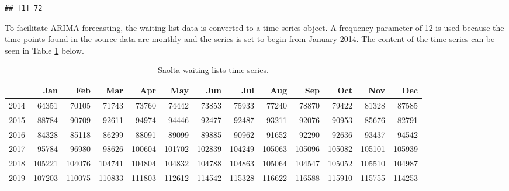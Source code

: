 \documentclass[
  12pt,
]{article}
\newenvironment{Shaded}{\begin{snugshade}}{\end{snugshade}}
\newcommand{\DataTypeTok}[1]{\textcolor[rgb]{0.13,0.29,0.53}{#1}}
\newcommand{\DecValTok}[1]{\textcolor[rgb]{0.00,0.00,0.81}{#1}}
\newcommand{\KeywordTok}[1]{\textcolor[rgb]{0.13,0.29,0.53}{\textbf{#1}}}
\newcommand{\NormalTok}[1]{#1}
\newcommand{\OperatorTok}[1]{\textcolor[rgb]{0.81,0.36,0.00}{\textbf{#1}}}
\newcommand{\StringTok}[1]{\textcolor[rgb]{0.31,0.60,0.02}{#1}}
\begin{document}
\begin{verbatim}
## [1] 72
\end{verbatim}

\normalsize

To facilitate ARIMA forecasting, the waiting list data is converted to a time series object. A frequency parameter of 12 is used because the time points found in the source data are monthly and the series is set to begin from January 2014. The content of the time series can be seen in Table \ref{tab:ts-table} below.

\begin{Shaded}
\end{Shaded}

\begin{table}[ht]
\centering
\begingroup\fontsize{7.5pt}{8pt}\selectfont
\begin{tabularx}{\textwidth}{rrrrrrrrrrrrr}
  \hline
 & Jan & Feb & Mar & Apr & May & Jun & Jul & Aug & Sep & Oct & Nov & Dec \\ 
  \hline
2014 & 64351 & 70105 & 71743 & 73760 & 74442 & 73853 & 75933 & 77240 & 78870 & 79422 & 81328 & 87585 \\ 
  2015 & 88784 & 90709 & 92611 & 94974 & 94446 & 92477 & 92487 & 93211 & 92076 & 90953 & 85676 & 82791 \\ 
  2016 & 84328 & 85118 & 86299 & 88091 & 89099 & 89885 & 90962 & 91652 & 92290 & 92636 & 93437 & 94542 \\ 
  2017 & 95784 & 96980 & 98626 & 100604 & 101702 & 102839 & 104249 & 105063 & 105096 & 105082 & 105101 & 105939 \\ 
  2018 & 105221 & 104076 & 104741 & 104804 & 104832 & 104788 & 104863 & 105064 & 104547 & 105052 & 105510 & 104987 \\ 
  2019 & 107203 & 110075 & 110833 & 111803 & 112612 & 114542 & 115328 & 116622 & 116588 & 115910 & 115755 & 114253 \\ 
   \hline
\end{tabularx}
\endgroup
\caption{Saolta waiting lists time series.} 
\label{tab:ts-table}
\end{table}
\end{document}
